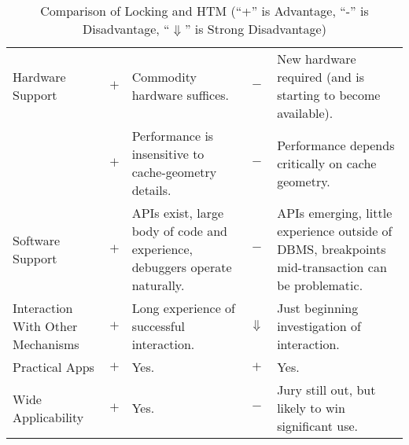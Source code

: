 \begin{table*}[p]
\begin{center}
\begin{tabular}{p{1.0in}||c|p{2.0in}||c|p{2.0in}}
\hline
Hardware Support
	& $+$
	& Commodity hardware suffices.
		& $-$
		& New hardware required (and is starting to become
		  available). \\
\cline{2-5}
	& $+$
	& Performance is insensitive to cache-geometry details.
		& $-$
		& Performance depends critically on cache geometry. \\
\hline
Software Support
	& $+$
	& APIs exist, large body of code and experience, debuggers operate
	  naturally.
		& $-$
		& APIs emerging, little experience outside of DBMS,
		  breakpoints mid-transaction can be problematic. \\
\hline
Interaction With Other Mechanisms
	& $+$
	& Long experience of successful interaction.
		& $\Downarrow$
		& Just beginning investigation of interaction. \\
\hline
Practical Apps
	& $+$
	& Yes.
		& $+$
		& Yes. \\
\hline
Wide Applicability
	& $+$
	& Yes.
		& $-$
		& Jury still out, but likely to win significant use. \\
\end{tabular}
\end{center}
\caption{Comparison of Locking and HTM (``+'' is Advantage, ``-'' is Disadvantage, ``$\Downarrow$'' is Strong Disadvantage)}
\label{tab:future:Comparison of Locking and HTM}
\end{table*}
